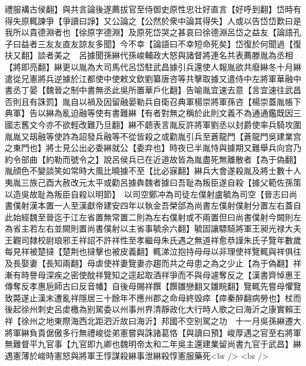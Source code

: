 禮服褠古侯翻】與共言論後遂薦拔官至侍御史原性忠壮好直言【好呼到翻】岱時有得失原輒諫爭【爭讀曰諍】又公論之【公然於衆中論其得失】人或以告岱岱歎曰是我所以貴德淵者也【徐原字德淵】及原死岱哭之甚哀曰徐德淵呂岱之益友【論語孔子曰益者三友友直友諒友多聞】今不幸【論語曰不幸短命死矣】岱復於何聞過【復扶又翻】談者美之　呂據聞孫綝代孫峻輔政大怒與諸督將連名共表薦滕胤為丞相【將即亮翻】綝更以胤為大司馬代呂岱駐武昌據引兵還使人報胤欲共廢綝冬十月綝遣從兄憲將兵逆據於江都使中使敕文欽劉纂唐咨等共擊取據又遣侍中左將軍華融中書丞丁晏【魏晉之制中書無丞此吳所置華戶化翻】告喻胤宜速去意【言宜速往武昌否則且有誅罰】胤自以禍及因留融晏勒兵自衛召典軍楊崇將軍孫咨【楊崇蓋胤帳下典軍】告以綝為亂迫融等使有書難綝【有者對無之稱於此則文義不為通通鑑既因三國志舊文今亦不欲輕改難乃旦翻】綝不聼表言胤反許將軍劉丞以封爵使率兵騎攻圍胤胤又刼融等使詐為詔發兵融等不從皆殺之或勸胤引兵至蒼龍門【蒼龍門吳建業宫之東門也】將士見公出必委綝就公【委弃也】時夜已半胤恃與據期又難舉兵向宫乃約令部曲【約勒而號令之】說呂侯兵已在近道故皆為胤盡死無離散者【為于偽翻】胤顔色不變談笑如常時大風比曉據不至【比必寐翻】綝兵大會遂殺胤及將士數十人夷胤三族己酉大赦改元太平或勸呂據犇魏者據曰吾耻為叛臣遂自殺【據父範佐孫策以造吳故耻為叛臣自殺以明節】　以司空鄭冲為司徒左僕射盧毓為司空【晉志曰尚書僕射漢本置一人至漢獻帝建安四年以執金吾榮郃為尚書左僕射僕射分置左右蓋自此始經魏至晉迄于江左省置無常置二則為左右僕射或不兩置但曰尚書僕射今闕則左為省主若左右並闕則置尚書僕射以主省事毓余六翻】毓固讓驃騎將軍王昶光禄大夫王觀司隸校尉琅邪王祥詔不許祥性至孝繼母朱氏遇之無道祥愈恭謹朱氏子覽年數歲每見祥被楚撻【楚荆也撻擊也被皮義翻】輒涕泣抱持母母以非理使祥覽輒與祥俱往及長娶妻【長知兩翻】母虐使祥妻覽妻亦趨而共之母患之為之少止【為于偽翻】祥漸有時譽母深疾之密使酖祥覽知之逕起取酒祥爭而不與母遽奪反之【漢書齊悼惠王傳奪反孝惠巵師古曰反音幡】自後母賜祥饌【饌雛戀翻又雛睆翻】覽輒先嘗母懼覽致斃遂止漢末遭亂祥隱居三十餘年不應州郡之命母終毁瘁【瘁秦醉翻病勞也】杖而後起徐州刺史呂䖍檄為别駕委以州事州界清靜政化大行時人歌之曰海沂之康實賴王祥【徐州之地東際海西北距泗沂故曰海沂】邦國不空别駕之功　十一月吳孫綝遷大將軍綝負貴倨傲多行無禮峻從弟憲嘗與誅諸葛恪【與讀曰預】峻厚遇之官至右將軍無難督平九官事【九官即九卿也魏明帝太和二年吳主還建業留尚書九官于武昌】綝遇憲薄於峻時憲怒與將軍王惇謀殺綝事泄綝殺惇憲服藥死<br />
<br />

